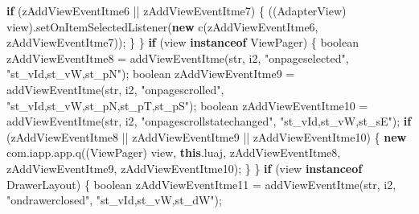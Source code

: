 \documentclass[
]{article}
\newenvironment{Shaded}{}{}
\newcommand{\ControlFlowTok}[1]{\textcolor[rgb]{0.00,0.44,0.13}{\textbf{#1}}}
\newcommand{\DataTypeTok}[1]{\textcolor[rgb]{0.56,0.13,0.00}{#1}}
\newcommand{\FunctionTok}[1]{\textcolor[rgb]{0.02,0.16,0.49}{#1}}
\newcommand{\KeywordTok}[1]{\textcolor[rgb]{0.00,0.44,0.13}{\textbf{#1}}}
\newcommand{\NormalTok}[1]{#1}
\newcommand{\OperatorTok}[1]{\textcolor[rgb]{0.40,0.40,0.40}{#1}}
\newcommand{\StringTok}[1]{\textcolor[rgb]{0.25,0.44,0.63}{#1}}
\begin{document}
\begin{Shaded}
\begin{Highlighting}[]
            \ControlFlowTok{if} \OperatorTok{(}\NormalTok{zAddViewEventItme6 }\OperatorTok{||}\NormalTok{ zAddViewEventItme7}\OperatorTok{)} \OperatorTok{\{}
                \OperatorTok{((}\NormalTok{AdapterView}\OperatorTok{)}\NormalTok{ view}\OperatorTok{).}\FunctionTok{setOnItemSelectedListener}\OperatorTok{(}\KeywordTok{new} \FunctionTok{c}\OperatorTok{(}\NormalTok{zAddViewEventItme6}\OperatorTok{,}\NormalTok{ zAddViewEventItme7}\OperatorTok{));}
            \OperatorTok{\}}
        \OperatorTok{\}}
        \ControlFlowTok{if} \OperatorTok{(}\NormalTok{view }\KeywordTok{instanceof}\NormalTok{ ViewPager}\OperatorTok{)} \OperatorTok{\{}
            \DataTypeTok{boolean}\NormalTok{ zAddViewEventItme8 }\OperatorTok{=} \FunctionTok{addViewEventItme}\OperatorTok{(}\NormalTok{str}\OperatorTok{,}\NormalTok{ i2}\OperatorTok{,} \StringTok{"onpageselected"}\OperatorTok{,} \StringTok{"st\_vId,st\_vW,st\_pN"}\OperatorTok{);}
            \DataTypeTok{boolean}\NormalTok{ zAddViewEventItme9 }\OperatorTok{=} \FunctionTok{addViewEventItme}\OperatorTok{(}\NormalTok{str}\OperatorTok{,}\NormalTok{ i2}\OperatorTok{,} \StringTok{"onpagescrolled"}\OperatorTok{,} \StringTok{"st\_vId,st\_vW,st\_pN,st\_pT,st\_pS"}\OperatorTok{);}
            \DataTypeTok{boolean}\NormalTok{ zAddViewEventItme10 }\OperatorTok{=} \FunctionTok{addViewEventItme}\OperatorTok{(}\NormalTok{str}\OperatorTok{,}\NormalTok{ i2}\OperatorTok{,} \StringTok{"onpagescrollstatechanged"}\OperatorTok{,} \StringTok{"st\_vId,st\_vW,st\_sE"}\OperatorTok{);}
            \ControlFlowTok{if} \OperatorTok{(}\NormalTok{zAddViewEventItme8 }\OperatorTok{||}\NormalTok{ zAddViewEventItme9 }\OperatorTok{||}\NormalTok{ zAddViewEventItme10}\OperatorTok{)} \OperatorTok{\{}
                \KeywordTok{new}\NormalTok{ com}\OperatorTok{.}\FunctionTok{iapp}\OperatorTok{.}\FunctionTok{app}\OperatorTok{.}\FunctionTok{q}\OperatorTok{((}\NormalTok{ViewPager}\OperatorTok{)}\NormalTok{ view}\OperatorTok{,} \KeywordTok{this}\OperatorTok{.}\FunctionTok{luaj}\OperatorTok{,}\NormalTok{ zAddViewEventItme8}\OperatorTok{,}\NormalTok{ zAddViewEventItme9}\OperatorTok{,}\NormalTok{ zAddViewEventItme10}\OperatorTok{);}
            \OperatorTok{\}}
        \OperatorTok{\}}
        \ControlFlowTok{if} \OperatorTok{(}\NormalTok{view }\KeywordTok{instanceof}\NormalTok{ DrawerLayout}\OperatorTok{)} \OperatorTok{\{}
            \DataTypeTok{boolean}\NormalTok{ zAddViewEventItme11 }\OperatorTok{=} \FunctionTok{addViewEventItme}\OperatorTok{(}\NormalTok{str}\OperatorTok{,}\NormalTok{ i2}\OperatorTok{,} \StringTok{"ondrawerclosed"}\OperatorTok{,} \StringTok{"st\_vId,st\_vW,st\_dW"}\OperatorTok{);}

\end{Highlighting}
\end{Shaded}
\end{document}
